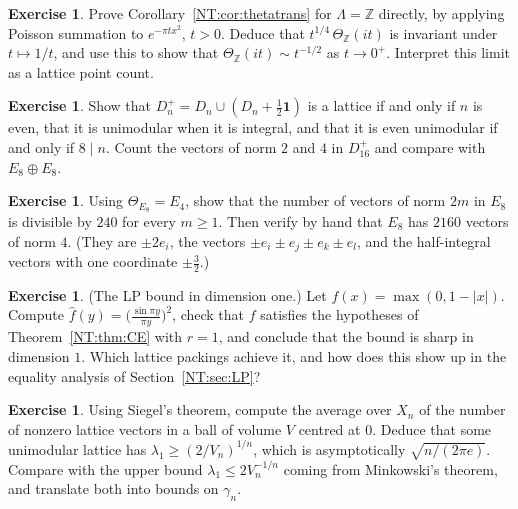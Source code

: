\documentclass[11pt,openany]{book}
\theoremstyle{plain}
\theoremstyle{definition}
\newtheorem{exercise}[theorem]{Exercise}
\theoremstyle{remark}
\newcommand{\Z}{\mathbb{Z}}
\newcommand{\Lat}{\Lambda}             %
\newcommand{\abs}[1]{\left\lvert #1 \right\rvert}
\begin{document}
\begin{exercise}
Prove Corollary~\ref{NT:cor:thetatrans} for $\Lat=\Z$ directly, by applying Poisson summation to
$e^{-\pi tx^2}$, $t>0$. Deduce that $t^{1/4}\,\Theta_\Z(it)$ is invariant under $t\mapsto1/t$, and use this to
show that $\Theta_\Z(it)\sim t^{-1/2}$ as $t\to0^+$. Interpret this limit as a lattice point count.
\end{exercise}

\begin{exercise}\label{NT:ex:D16}
Show that $D_n^+=D_n\cup(D_n+\frac12\mathbf 1)$ is a lattice if and only if $n$ is even, that it is
unimodular when it is integral, and that it is even unimodular if and only if $8\mid n$. Count the vectors of
norm $2$ and $4$ in $D_{16}^+$ and compare with $E_8\oplus E_8$.
\end{exercise}

\begin{exercise}
Using $\Theta_{E_8}=E_4$, show that the number of vectors of norm $2m$ in $E_8$ is divisible by $240$ for every $m\ge1$.
Then verify by hand that $E_8$ has $2160$ vectors of norm $4$. (They are $\pm2e_i$, the vectors
$\pm e_i\pm e_j\pm e_k\pm e_l$, and the half-integral vectors with one coordinate $\pm\frac32$.)
\end{exercise}

\begin{exercise}
(The LP bound in dimension one.) Let $f(x)=\max(0,1-\abs x)$. Compute $\hat f(y)=\big(\frac{\sin\pi y}{\pi y}\big)^2$,
check that $f$ satisfies the hypotheses of Theorem~\ref{NT:thm:CE} with $r=1$, and conclude that the bound is
sharp in dimension $1$. Which lattice packings achieve it, and how does this show up in the equality analysis of
Section~\ref{NT:sec:LP}?
\end{exercise}

\begin{exercise}
Using Siegel's theorem, compute the average over $X_n$ of the number of nonzero lattice vectors in a ball
of volume $V$ centred at $0$. Deduce that some unimodular lattice has $\lambda_1\ge(2/V_n)^{1/n}$, which is
asymptotically $\sqrt{n/(2\pi e)}$. Compare with the upper bound $\lambda_1\le2V_n^{-1/n}$ coming from
Minkowski's theorem, and translate both into bounds on $\gamma_n$.
\end{exercise}
\end{document}
